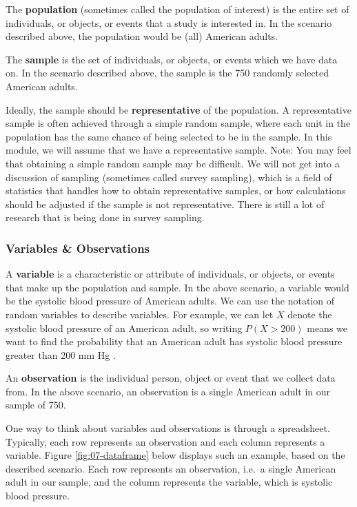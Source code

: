 \documentclass[
]{book}
\begin{document}
The \textbf{population} (sometimes called the population of interest) is the entire set of individuals, or objects, or events that a study is interested in. In the scenario described above, the population would be (all) American adults.

The \textbf{sample} is the set of individuals, or objects, or events which we have data on. In the scenario described above, the sample is the 750 randomly selected American adults.

Ideally, the sample should be \textbf{representative} of the population. A representative sample is often achieved through a simple random sample, where each unit in the population has the same chance of being selected to be in the sample. In this module, we will assume that we have a representative sample. Note: You may feel that obtaining a simple random sample may be difficult. We will not get into a discussion of sampling (sometimes called survey sampling), which is a field of statistics that handles how to obtain representative samples, or how calculations should be adjusted if the sample is not representative. There is still a lot of research that is being done in survey sampling.

\hypertarget{variables-observations}{%
\subsubsection{Variables \& Observations}\label{variables-observations}}

A \textbf{variable} is a characteristic or attribute of individuals, or objects, or events that make up the population and sample. In the above scenario, a variable would be the systolic blood pressure of American adults. We can use the notation of random variables to describe variables. For example, we can let \(X\) denote the systolic blood pressure of an American adult, so writing \(P(X>200)\) means we want to find the probability that an American adult has systolic blood pressure greater than 200 mm Hg .

An \textbf{observation} is the individual person, object or event that we collect data from. In the above scenario, an observation is a single American adult in our sample of 750.

One way to think about variables and observations is through a spreadsheet. Typically, each row represents an observation and each column represents a variable. Figure \ref{fig:07-dataframe} below displays such an example, based on the described scenario. Each row represents an observation, i.e.~a single American adult in our sample, and the column represents the variable, which is systolic blood pressure.
\end{document}
